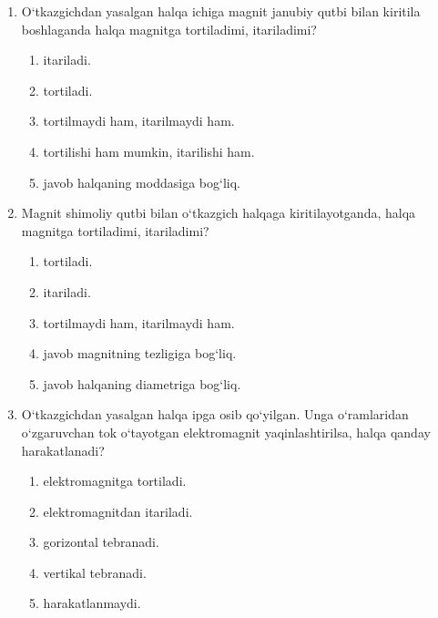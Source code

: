 \begin{enumerate}
\begin{enumerate}[label=\Alph*)]
\item 4 A, “1” yo‘nalishda.
\item 4 A, “2” yo‘nalishda.
\item 5 A, “1” yo‘nalishda.
\item 5 A, “2” yo‘nalishda.
\item 2 A, “1” yo‘nalishda.
\end{enumerate}

\item O‘tkazgichdan yasalgan halqa ichiga magnit janubiy qutbi bilan kiritila boshlaganda halqa magnitga tortiladimi, itariladimi?
\begin{enumerate}[label=\Alph*)]
\item itariladi.
\item tortiladi.
\item tortilmaydi ham, itarilmaydi ham.
\item tortilishi ham mumkin, itarilishi ham.
\item javob halqaning moddasiga bog‘liq.
\end{enumerate}

\item Magnit shimoliy qutbi bilan o‘tkazgich halqaga kiritilayotganda, halqa magnitga tortiladimi, itariladimi?
\begin{enumerate}[label=\Alph*)]
\item tortiladi.
\item itariladi.
\item tortilmaydi ham, itarilmaydi ham.
\item javob magnitning tezligiga bog‘liq.
\item javob halqaning diametriga bog‘liq.
\end{enumerate}

\item O‘tkazgichdan yasalgan halqa ipga osib qo‘yilgan. Unga o‘ramlaridan o‘zgaruvchan tok o‘tayotgan elektromagnit yaqinlashtirilsa, halqa qanday harakatlanadi?
\begin{enumerate}[label=\Alph*)]
\item elektromagnitga tortiladi.
\item elektromagnitdan itariladi.
\item gorizontal tebranadi.
\item vertikal tebranadi.
\item harakatlanmaydi.
\end{enumerate}


\end{enumerate}
